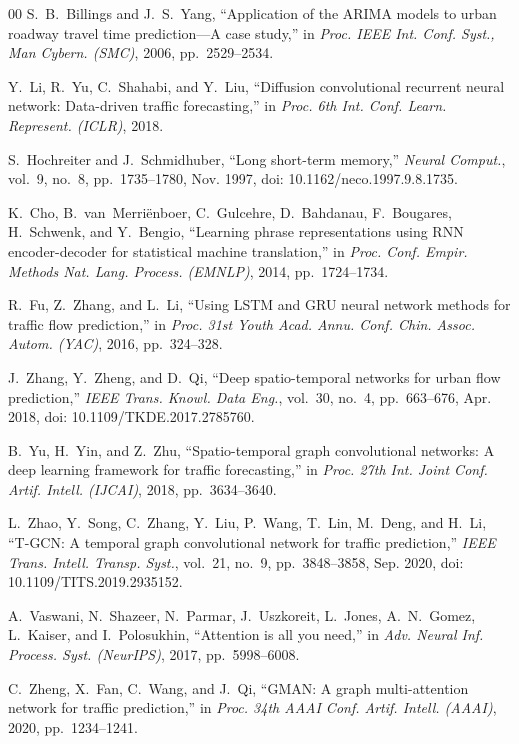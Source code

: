 \documentclass[conference]{IEEEtran}
\begin{document}
\begin{thebibliography}{00}
S.~B.~Billings and J.~S.~Yang, ``Application of the ARIMA models to urban roadway travel time prediction---A case study,'' in \emph{Proc. IEEE Int. Conf. Syst., Man Cybern. (SMC)}, 2006, pp.~2529--2534.

Y.~Li, R.~Yu, C.~Shahabi, and Y.~Liu, ``Diffusion convolutional recurrent neural network: Data-driven traffic forecasting,'' in \emph{Proc. 6th Int. Conf. Learn. Represent. (ICLR)}, 2018.

S.~Hochreiter and J.~Schmidhuber, ``Long short-term memory,'' \emph{Neural Comput.}, vol.~9, no.~8, pp.~1735--1780, Nov. 1997, doi: 10.1162/neco.1997.9.8.1735.

K.~Cho, B.~van~Merri{\"e}nboer, C.~Gulcehre, D.~Bahdanau, F.~Bougares, H.~Schwenk, and Y.~Bengio, ``Learning phrase representations using RNN encoder-decoder for statistical machine translation,'' in \emph{Proc. Conf. Empir. Methods Nat. Lang. Process. (EMNLP)}, 2014, pp.~1724--1734.

R.~Fu, Z.~Zhang, and L.~Li, ``Using LSTM and GRU neural network methods for traffic flow prediction,'' in \emph{Proc. 31st Youth Acad. Annu. Conf. Chin. Assoc. Autom. (YAC)}, 2016, pp.~324--328.

J.~Zhang, Y.~Zheng, and D.~Qi, ``Deep spatio-temporal networks for urban flow prediction,'' \emph{IEEE Trans. Knowl. Data Eng.}, vol.~30, no.~4, pp.~663--676, Apr. 2018, doi: 10.1109/TKDE.2017.2785760.

B.~Yu, H.~Yin, and Z.~Zhu, ``Spatio-temporal graph convolutional networks: A deep learning framework for traffic forecasting,'' in \emph{Proc. 27th Int. Joint Conf. Artif. Intell. (IJCAI)}, 2018, pp.~3634--3640.

L.~Zhao, Y.~Song, C.~Zhang, Y.~Liu, P.~Wang, T.~Lin, M.~Deng, and H.~Li, ``T-GCN: A temporal graph convolutional network for traffic prediction,'' \emph{IEEE Trans. Intell. Transp. Syst.}, vol.~21, no.~9, pp.~3848--3858, Sep. 2020, doi: 10.1109/TITS.2019.2935152.

A.~Vaswani, N.~Shazeer, N.~Parmar, J.~Uszkoreit, L.~Jones, A.~N.~Gomez, L.~Kaiser, and I.~Polosukhin, ``Attention is all you need,'' in \emph{Adv. Neural Inf. Process. Syst. (NeurIPS)}, 2017, pp.~5998--6008.

C.~Zheng, X.~Fan, C.~Wang, and J.~Qi, ``GMAN: A graph multi-attention network for traffic prediction,'' in \emph{Proc. 34th AAAI Conf. Artif. Intell. (AAAI)}, 2020, pp.~1234--1241.


\end{thebibliography}
\end{document}
